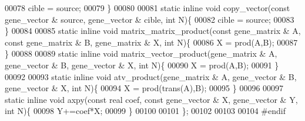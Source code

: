 \begin{DoxyCode}
00078     cible = source;
00079   \}
00080 
00081   \textcolor{keyword}{static} \textcolor{keyword}{inline} \textcolor{keywordtype}{void} copy\_vector(\textcolor{keyword}{const} gene\_vector & source, gene\_vector & cible, \textcolor{keywordtype}{int} N)\{
00082     cible = source;
00083   \}
00084 
00085   \textcolor{keyword}{static} \textcolor{keyword}{inline} \textcolor{keywordtype}{void} matrix\_matrix\_product(\textcolor{keyword}{const} gene\_matrix & A, \textcolor{keyword}{const} gene\_matrix & B, gene\_matrix & X, \textcolor{keywordtype}{
      int} N)\{
00086     X = prod(A,B);
00087   \}
00088 
00089   \textcolor{keyword}{static} \textcolor{keyword}{inline} \textcolor{keywordtype}{void} matrix\_vector\_product(gene\_matrix & A, gene\_vector & B, gene\_vector & X, \textcolor{keywordtype}{int} N)\{
00090     X = prod(A,B);
00091   \}
00092 
00093   \textcolor{keyword}{static} \textcolor{keyword}{inline} \textcolor{keywordtype}{void} atv\_product(gene\_matrix & A, gene\_vector & B, gene\_vector & X, \textcolor{keywordtype}{int} N)\{
00094     X = prod(trans(A),B);
00095   \}
00096 
00097   \textcolor{keyword}{static} \textcolor{keyword}{inline} \textcolor{keywordtype}{void} axpy(\textcolor{keyword}{const} real coef, \textcolor{keyword}{const} gene\_vector & X, gene\_vector & Y, \textcolor{keywordtype}{int} N)\{
00098     Y+=coef*X;
00099   \}
00100 
00101 \};
00102 
00103 
00104 \textcolor{preprocessor}{#endif}
\end{DoxyCode}
